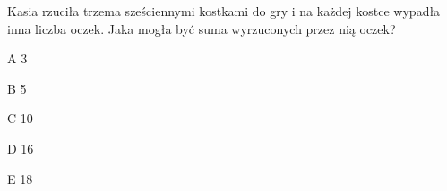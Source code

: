 \begin{tresc}
Kasia rzuciła trzema sześciennymi kostkami do gry i na każdej kostce wypadła inna liczba oczek. Jaka mogła być suma wyrzuconych przez nią oczek?
\end{tresc}
\begin{wariant}{A} 3 \end{wariant}
\begin{wariant}{B} 5 \end{wariant}
\begin{wariant}{C} 10 \end{wariant}
\begin{wariant}{D} 16 \end{wariant}
\begin{wariant}{E} 18 \end{wariant}
